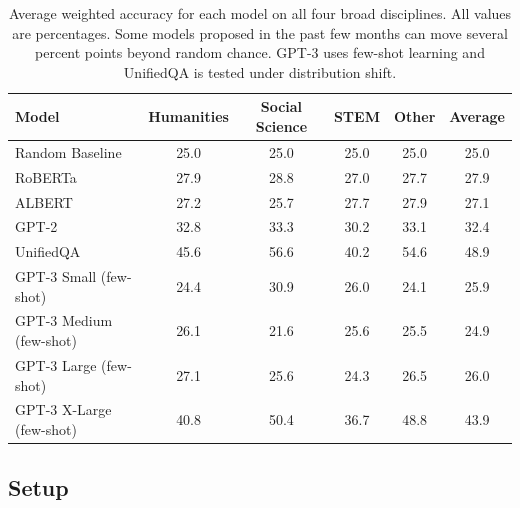 \begin{table}[b]
\setlength{\tabcolsep}{9pt}
\vspace{-5pt}
\fontsize{10}{11}\selectfont
\centering
\begin{tabular}{lcccc|c}
Model       & Humanities & Social Science & STEM & Other &  Average \\
\hline
Random Baseline & 25.0 & 25.0 & 25.0 & 25.0 & 25.0 \\
RoBERTa           & 27.9 & 28.8 & 27.0 & 27.7 & 27.9 \\
ALBERT           & 27.2 & 25.7 & 27.7 & 27.9 & 27.1 \\
GPT-2           & 32.8 & 33.3 & 30.2 & 33.1 & 32.4 \\
UnifiedQA       & 45.6 & 56.6 & 40.2 & 54.6 & 48.9 \\
GPT-3 Small (few-shot)     & 24.4 & 30.9 & 26.0 & 24.1 & 25.9 \\
GPT-3 Medium (few-shot)   & 26.1 & 21.6 & 25.6 & 25.5 & 24.9 \\
GPT-3 Large (few-shot)     & 27.1 & 25.6 & 24.3 & 26.5 & 26.0 \\
GPT-3 X-Large (few-shot)   & 40.8 & 50.4 & 36.7 & 48.8 & 43.9 \\
\hline
\end{tabular}
\caption{Average weighted accuracy for each model on all four broad disciplines. All values are percentages. Some models proposed in the past few months can move several percent points beyond random chance. GPT-3 uses few-shot learning and UnifiedQA is tested under distribution shift.}
\label{tab:mainresults}
\end{table}


\subsection{Setup}

